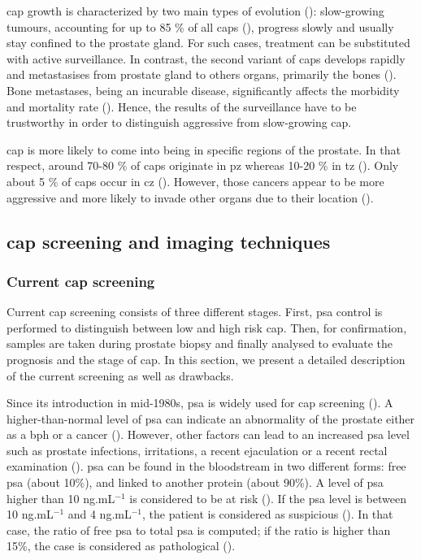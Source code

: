 \ac{cap} growth is characterized by two main types of evolution (\cite{Strum2005}): slow-growing tumours, accounting for up to 85 \% of all \acp{cap} (\cite{Lu-Yao2009}), progress slowly and usually stay confined to the prostate gland. For such cases, treatment can be substituted with active surveillance. In contrast, the second variant of \acp{cap} develops rapidly and metastasises from prostate gland to others organs, primarily the bones (\cite{Oster2013}). Bone metastases, being an incurable disease, significantly affects the morbidity and mortality rate (\cite{Ye2007}). Hence, the  results of the surveillance have to be trustworthy in order to distinguish aggressive from slow-growing \ac{cap}.

\ac{cap} is more likely to come into being in specific regions of the prostate. In that respect, around 70-80 \% of \acp{cap} originate in \ac{pz} whereas 10-20 \% in \ac{tz} (\cite{Carrol1987,McNeal1988,Stamey1998}). Only about 5 \% of \acp{cap} occur in \ac{cz} (\cite{McNeal1988,Cohen2008}). However, those cancers appear to be more aggressive and more likely to invade other organs due to their location (\cite{Cohen2008}).

\subsection{\ac{cap} screening and imaging techniques}

\subsubsection{Current \ac{cap} screening}\label{subsubsec:curscr}

Current \ac{cap} screening consists of three different stages. First, \ac{psa} control is performed to distinguish between low and high risk \ac{cap}. Then, for confirmation, samples are taken during prostate biopsy and finally analysed to evaluate the prognosis and the stage of \ac{cap}. In this section, we present a detailed description of the current screening as well as drawbacks.

Since its introduction in mid-1980s, \ac{psa} is widely used for \ac{cap} screening (\cite{Etzioni2002}). A higher-than-normal level of \ac{psa} can indicate an abnormality of the prostate either as a \ac{bph} or a cancer (\cite{Hoeks2011}). However, other factors can lead to an increased \ac{psa} level such as prostate infections, irritations, a recent ejaculation or a recent rectal examination (\cite{Parfait2010}). \ac{psa} can be found in the bloodstream in two different forms: free \ac{psa} (about 10\%), and linked to another protein (about 90\%). A level of \ac{psa} higher than 10 ng.mL$^{-1}$ is considered to be at risk (\cite{Parfait2010}). If the \ac{psa} level is between 10 ng.mL$^{-1}$ and 4 ng.mL$^{-1}$, the patient is considered as suspicious (\cite{Barentsz2012}). In that case, the ratio of free \ac{psa} to total \ac{psa} is computed; if the ratio is higher than 15\%, the case is considered as pathological (\cite{Parfait2010}).

